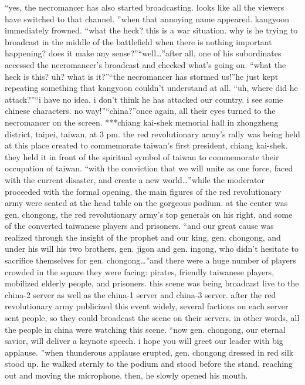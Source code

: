 “yes, the necromancer has also started broadcasting.
 looks like all the viewers have switched to that channel.
”when that annoying name appeared.
 kangyoon immediately frowned.
“what the heck? this is a war situation.
 why is he trying to broadcast in the middle of the battlefield when there is nothing important happening? does it make any sense?”“well…”after all, one of his subordinates accessed the necromancer’s broadcast and checked what’s going on.
“what the heck is this? uh? what is it?”“the necromancer has stormed us!”he just kept repeating something that kangyoon couldn’t understand at all.
“uh, where did he attack?”“i have no idea.
 i don’t think he has attacked our country.
 i see some chinese characters.
 no way!”“china?”once again, all their eyes turned to the necromancer on the screen.
***chiang kai-shek memorial hall in zhongzheng district, taipei, taiwan, at 3 pm.
the red revolutionary army’s rally was being held at this place created to commemorate taiwan’s first president, chiang kai-shek.
 they held it in front of the spiritual symbol of taiwan to commemorate their occupation of taiwan.
“with the conviction that we will unite as one force, faced with the current disaster, and create a new world…”while the moderator proceeded with the formal opening, the main figures of the red revolutionary army were seated at the head table on the gorgeous podium.
at the center was gen.
 chongong, the red revolutionary army’s top generals on his right, and some of the converted taiwanese players and prisoners.
“and our great cause was realized through the insight of the prophet and our king, gen.
 chongong, and under his will his two brothers, gen.
 jigon and gen.
 ingong, who didn’t hesitate to sacrifice themselves for gen.
 chongong…”and there were a huge number of players crowded in the square they were facing: pirates, friendly taiwanese players, mobilized elderly people, and prisoners.
this scene was being broadcast live to the china-2 server as well as the china-1 server and china-3 server.
after the red revolutionary army publicized this event widely, several factions on each server sent people, so they could broadcast the scene on their servers.
in other words, all the people in china were watching this scene.
“now gen.
 chongong, our eternal savior, will deliver a keynote speech.
 i hope you will greet our leader with big applause.
”when thunderous applause erupted, gen.
 chongong dressed in red silk stood up.
 he walked sternly to the podium and stood before the stand, reaching out and moving the microphone.
then, he slowly opened his mouth.
